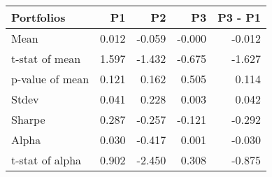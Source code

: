 \begin{tabular}{lrrrr}
\toprule
Portfolios & P1 & P2 & P3 & P3 - P1 \\
\midrule
Mean & 0.012 & -0.059 & -0.000 & -0.012 \\
t-stat of mean & 1.597 & -1.432 & -0.675 & -1.627 \\
p-value of mean & 0.121 & 0.162 & 0.505 & 0.114 \\
Stdev & 0.041 & 0.228 & 0.003 & 0.042 \\
Sharpe & 0.287 & -0.257 & -0.121 & -0.292 \\
Alpha & 0.030 & -0.417 & 0.001 & -0.030 \\
t-stat of alpha & 0.902 & -2.450 & 0.308 & -0.875 \\
\bottomrule
\end{tabular}
